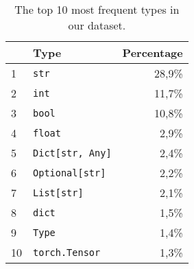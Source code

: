 \begin{table}[]
\centering
\scriptsize
\begin{tabular}{l l r}
\toprule
   & \textbf{Type}          & \textbf{Percentage}     \\ \midrule
1  & \texttt{str}            & 28,9\%            \\ \hline
2  & \texttt{int}            & 11,7\%            \\ \hline
3  & \texttt{bool}           & 10,8\%            \\ \hline
4  & \texttt{float}          &  2,9\%            \\ \hline
5  & \texttt{Dict[str, Any]} &  2,4\%            \\ \hline
6  & \texttt{Optional[str]}  &  2,2\%            \\ \hline
7  & \texttt{List[str]}      &  2,1\%            \\ \hline  
8  & \texttt{dict}           &  1,5\%            \\ \hline   
9  & \texttt{Type}           &  1,4\%            \\ \hline   
10 & \texttt{torch.Tensor}   &  1,3\%            \\ \hline  
\end{tabular}
\caption{The top 10 most frequent types in our dataset.}
\label{table:most-frequent-types}
\end{table}
